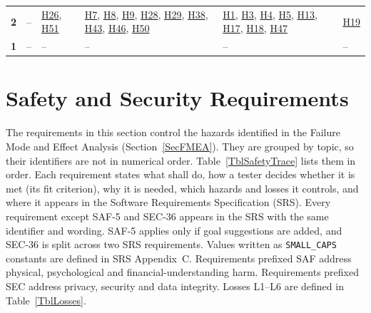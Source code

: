 \documentclass{article}
\begin{document}
\begin{table}[H]
\begin{tabularx}{\textwidth}{c *{5}{>{\raggedright\arraybackslash}X}}
    \textbf{2}
     & \cellcolor{white}--
     & \cellcolor{white}\hyperref[H26]{H26}, \hyperref[H51]{H51}
     & \cellcolor{gray!20}\hyperref[H7]{H7}, \hyperref[H8]{H8}, \hyperref[H9]{H9}, \hyperref[H28]{H28}, \hyperref[H29]{H29}, \hyperref[H38]{H38}, \hyperref[H43]{H43}, \hyperref[H46]{H46}, \hyperref[H50]{H50}
     & \cellcolor{gray!20}\hyperref[H1]{H1}, \hyperref[H3]{H3}, \hyperref[H4]{H4}, \hyperref[H5]{H5}, \hyperref[H13]{H13}, \hyperref[H17]{H17}, \hyperref[H18]{H18}, \hyperref[H47]{H47}
     & \cellcolor{gray!45}\hyperref[H19]{H19} \\
    \textbf{1}
     & \cellcolor{white}--
     & \cellcolor{white}--
     & \cellcolor{white}--
     & \cellcolor{white}--
     & \cellcolor{gray!20}-- \\
    \bottomrule
  \end{tabularx}
\end{table}

\section{Safety and Security Requirements} \label{SecSafetyReqs}
\sloppy


\newcommand{\hazreq}[8]{%
  \item[#1 (#2).]\phantomsection\label{req:#1} #3
  \begin{itemize}
    \item \textbf{Fit criterion:} #4
    \item \textbf{Rationale:} #5
    \item \textbf{Associated hazards:} #6
    \item \textbf{In SRS:} #7
    \item \textbf{Roadmap:} #8
  \end{itemize}}

The requirements in this section control the hazards identified in the Failure
Mode and Effect Analysis (Section~\ref{SecFMEA}). They are grouped by topic, so
their identifiers are not in numerical order. Table~\ref{TblSafetyTrace} lists
them in order.
Each requirement states what \progname{} shall do, how a tester decides whether
it is met (its fit criterion), why it is needed, which hazards and losses it
controls, and where it appears in the Software Requirements Specification
(SRS). Every requirement except SAF-5 and SEC-36 appears in the SRS with the
same identifier and wording. SAF-5 applies only if goal suggestions are added,
and SEC-36 is split across two SRS requirements. Values written as \texttt{SMALL\_CAPS} constants are defined in SRS
Appendix~C. Requirements prefixed SAF address physical, psychological and
financial-understanding harm. Requirements prefixed SEC address privacy,
security and data integrity. Losses L1--L6 are defined in Table~\ref{TblLosses}.
\end{document}
